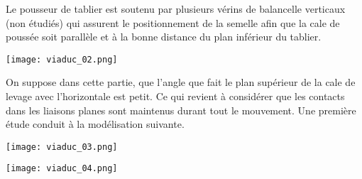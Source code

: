 Le pousseur de tablier est soutenu par plusieurs vérins de balancelle verticaux (non étudiés) qui assurent le positionnement de la semelle afin que la cale de poussée soit parallèle et à la bonne distance du plan inférieur du tablier. 

\begin{marginfigure}
\texttt{[image: viaduc\_02.png]}
\end{marginfigure}


On suppose dans cette partie, que l’angle que fait le plan supérieur de la cale de levage avec
l’horizontale est petit. Ce qui revient à considérer que les contacts dans les liaisons planes sont
maintenus durant tout le mouvement.
Une première étude conduit à la modélisation suivante.

\begin{marginfigure}
\texttt{[image: viaduc\_03.png]}
\end{marginfigure}

\ifprof
\begin{corrige}
\end{corrige}\else\fi

\ifprof
\begin{corrige}
\end{corrige}\else\fi


\ifprof
\begin{corrige}
\end{corrige}\else\fi


\ifprof
\begin{corrige}
\end{corrige}\else\fi



\begin{marginfigure}
\texttt{[image: viaduc\_04.png]}
\end{marginfigure}


\ifprof
\begin{corrige}
\end{corrige}\else\fi



